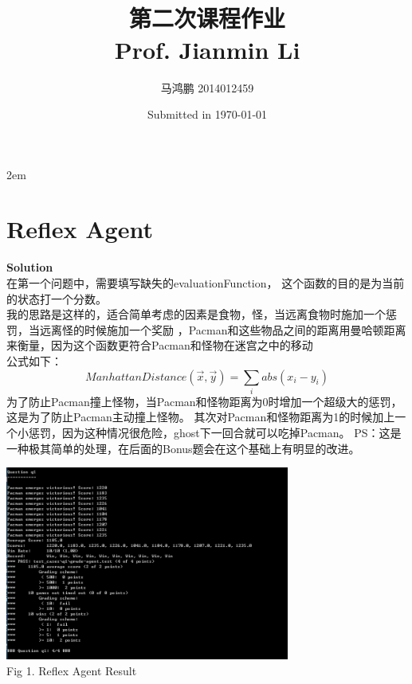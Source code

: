 \documentclass[a4paper]{article}
\title{\CJKfamily{hei}{人工智能导论}\\{\large{第二次课程作业}\\Prof. Jianmin Li}}
\author{马鸿鹏 2014012459}
\date{Submitted in \today}
\begin{document}
\maketitle
\newpage
 \parindent 2em   %
\section{Reflex Agent}
	

	\textbf{Solution}\\
	在第一个问题中，需要填写缺失的evaluationFunction， 这个函数的目的是为当前的状态打一个分数。\\
	我的思路是这样的，适合简单考虑的因素是食物，怪，当远离食物时施加一个惩罚，当远离怪的时候施加一个奖励
	，Pacman和这些物品之间的距离用曼哈顿距离来衡量，因为这个函数更符合Pacman和怪物在迷宫之中的移动
	\\
	公式如下：
	\begin{equation}
		ManhattanDistance(\vec{x}, \vec{y}) = \mathop{\sum}\limits_{i} abs(x_i - y_i)
	\end{equation}
	为了防止Pacman撞上怪物，当Pacman和怪物距离为0时增加一个超级大的惩罚，这是为了防止Pacman主动撞上怪物。
	其次对Pacman和怪物距离为1的时候加上一个小惩罚，因为这种情况很危险，ghost下一回合就可以吃掉Pacman。
	PS：这是一种极其简单的处理，在后面的Bonus题会在这个基础上有明显的改进。

	
	\begin{center}
        \includegraphics[width = 0.7\textwidth]{q1.png}\\
        Fig 1. Reflex Agent Result
    \end{center}
\end{document}
